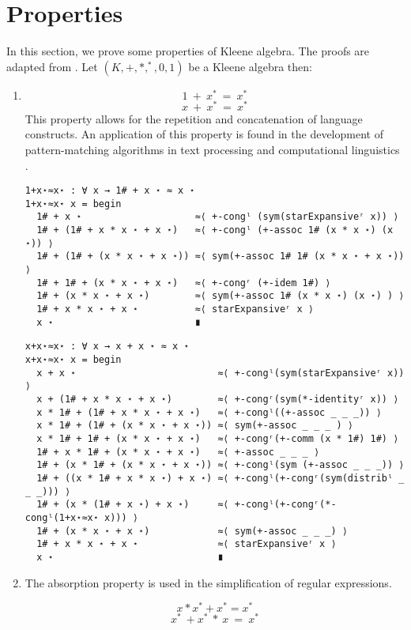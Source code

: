 \section{Properties}
In this section, we prove some properties of Kleene algebra. The proofs are
adapted from \cite{kozen1997kleene}.
Let $(K, +, *, ^{*}, 0, 1)$ be a Kleene
algebra then:
\begin{enumerate}
  \setlength{\itemindent}{0em}
  \item 
\[1\ +\ x^{*}\ =\ x^{*}\] 
\[x\ +\ x^{*}\ =\ x^{*}\]
This property allows for the repetition and concatenation of language
constructs. An application of this property is found in the development of
pattern-matching algorithms in text processing and computational linguistics
\cite{ulus2018pattern}.

\begin{verbatim}
1+x⋆≈x⋆ : ∀ x → 1# + x ⋆ ≈ x ⋆
1+x⋆≈x⋆ x = begin
  1# + x ⋆                    ≈⟨ +-congˡ (sym(starExpansiveʳ x)) ⟩ 
  1# + (1# + x * x ⋆ + x ⋆)   ≈⟨ +-congˡ (+-assoc 1# (x * x ⋆) (x ⋆)) ⟩ 
  1# + (1# + (x * x ⋆ + x ⋆)) ≈⟨ sym(+-assoc 1# 1# (x * x ⋆ + x ⋆)) ⟩ 
  1# + 1# + (x * x ⋆ + x ⋆)   ≈⟨ +-congʳ (+-idem 1#) ⟩ 
  1# + (x * x ⋆ + x ⋆)        ≈⟨ sym(+-assoc 1# (x * x ⋆) (x ⋆) ) ⟩ 
  1# + x * x ⋆ + x ⋆          ≈⟨ starExpansiveʳ x ⟩ 
  x ⋆                         ∎
\end{verbatim}

\begin{verbatim}
x+x⋆≈x⋆ : ∀ x → x + x ⋆ ≈ x ⋆
x+x⋆≈x⋆ x = begin
  x + x ⋆                         ≈⟨ +-congˡ(sym(starExpansiveʳ x)) ⟩
  x + (1# + x * x ⋆ + x ⋆)        ≈⟨ +-congʳ(sym(*-identityʳ x)) ⟩ 
  x * 1# + (1# + x * x ⋆ + x ⋆)   ≈⟨ +-congˡ((+-assoc _ _ _)) ⟩ 
  x * 1# + (1# + (x * x ⋆ + x ⋆)) ≈⟨ sym(+-assoc _ _ _ ) ⟩ 
  x * 1# + 1# + (x * x ⋆ + x ⋆)   ≈⟨ +-congʳ(+-comm (x * 1#) 1#) ⟩ 
  1# + x * 1# + (x * x ⋆ + x ⋆)   ≈⟨ +-assoc _ _ _ ⟩ 
  1# + (x * 1# + (x * x ⋆ + x ⋆)) ≈⟨ +-congˡ(sym (+-assoc _ _ _)) ⟩ 
  1# + ((x * 1# + x * x ⋆) + x ⋆) ≈⟨ +-congˡ(+-congʳ(sym(distribˡ _ _ _))) ⟩ 
  1# + (x * (1# + x ⋆) + x ⋆)     ≈⟨ +-congˡ(+-congʳ(*-congˡ(1+x⋆≈x⋆ x))) ⟩ 
  1# + (x * x ⋆ + x ⋆)            ≈⟨ sym(+-assoc _ _ _) ⟩ 
  1# + x * x ⋆ + x ⋆              ≈⟨ starExpansiveʳ x ⟩ 
  x ⋆                             ∎
\end{verbatim}
\item
The absorption property is used in the simplification of
regular expressions.

\[x * x^{*} + x^{*} = x^{*}\]
\[x^{*}\  + x^{*}\ *\ x\ =\ x^{*}\] 


\end{enumerate}

